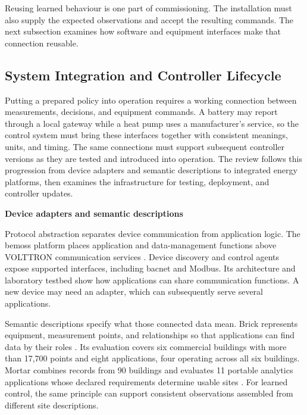 Reusing learned behaviour is one part of commissioning. The installation must also supply the expected observations and accept the resulting commands. The next subsection examines how software and equipment interfaces make that connection reusable.

\subsection{System Integration and Controller Lifecycle}
\label{sec:ch3-deployment-evidence}

Putting a prepared policy into operation requires a working connection between measurements, decisions, and equipment commands. A battery may report through a local gateway while a heat pump uses a manufacturer's service, so the control system must bring these interfaces together with consistent meanings, units, and timing. The same connections must support subsequent controller versions as they are tested and introduced into operation. The review follows this progression from device adapters and semantic descriptions to integrated energy platforms, then examines the infrastructure for testing, deployment, and controller updates.

\smallskip
\noindent\textbf{Device adapters and semantic descriptions}\par\nobreak\smallskip
Protocol abstraction separates device communication from application logic. The \gls{bemoss} platform places application and data-management functions above VOLTTRON communication services \parencite{khamphanchai2014bemoss}. Device discovery and control agents expose supported interfaces, including \gls{bacnet} and Modbus. Its architecture and laboratory testbed show how applications can share communication functions. A new device may need an adapter, which can subsequently serve several applications.

Semantic descriptions specify what those connected data mean. Brick represents equipment, measurement points, and relationships so that applications can find data by their roles \parencite{balaji2018brick}. Its evaluation covers six commercial buildings with more than 17,700 points and eight applications, four operating across all six buildings. Mortar combines records from 90 buildings and evaluates 11 portable analytics applications whose declared requirements determine usable sites \parencite{fierro2018mortar}. For learned control, the same principle can support consistent observations assembled from different site descriptions.

